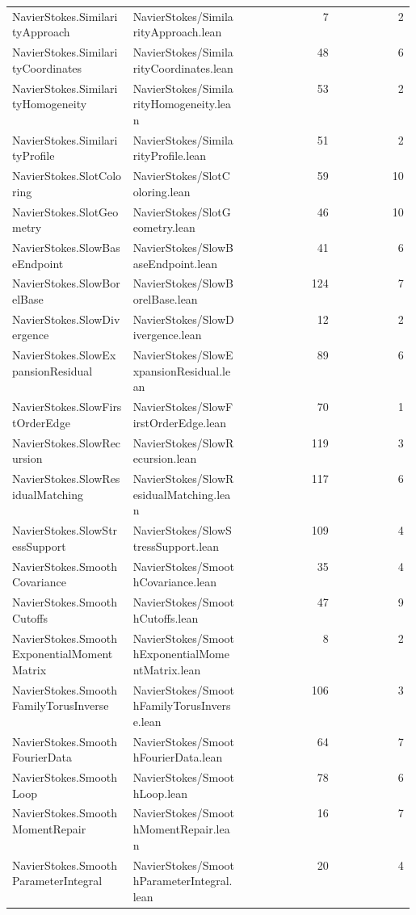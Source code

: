 \begin{longtable}{p{0.30\linewidth}p{0.28\linewidth}rr}
NavierStokes.SimilarityApproach & NavierStokes/SimilarityApproach.lean & 7 & 2\\
NavierStokes.SimilarityCoordinates & NavierStokes/SimilarityCoordinates.lean & 48 & 6\\
NavierStokes.SimilarityHomogeneity & NavierStokes/SimilarityHomogeneity.lean & 53 & 2\\
NavierStokes.SimilarityProfile & NavierStokes/SimilarityProfile.lean & 51 & 2\\
NavierStokes.SlotColoring & NavierStokes/SlotColoring.lean & 59 & 10\\
NavierStokes.SlotGeometry & NavierStokes/SlotGeometry.lean & 46 & 10\\
NavierStokes.SlowBaseEndpoint & NavierStokes/SlowBaseEndpoint.lean & 41 & 6\\
NavierStokes.SlowBorelBase & NavierStokes/SlowBorelBase.lean & 124 & 7\\
NavierStokes.SlowDivergence & NavierStokes/SlowDivergence.lean & 12 & 2\\
NavierStokes.SlowExpansionResidual & NavierStokes/SlowExpansionResidual.lean & 89 & 6\\
NavierStokes.SlowFirstOrderEdge & NavierStokes/SlowFirstOrderEdge.lean & 70 & 1\\
NavierStokes.SlowRecursion & NavierStokes/SlowRecursion.lean & 119 & 3\\
NavierStokes.SlowResidualMatching & NavierStokes/SlowResidualMatching.lean & 117 & 6\\
NavierStokes.SlowStressSupport & NavierStokes/SlowStressSupport.lean & 109 & 4\\
NavierStokes.SmoothCovariance & NavierStokes/SmoothCovariance.lean & 35 & 4\\
NavierStokes.SmoothCutoffs & NavierStokes/SmoothCutoffs.lean & 47 & 9\\
NavierStokes.SmoothExponentialMomentMatrix & NavierStokes/SmoothExponentialMomentMatrix.lean & 8 & 2\\
NavierStokes.SmoothFamilyTorusInverse & NavierStokes/SmoothFamilyTorusInverse.lean & 106 & 3\\
NavierStokes.SmoothFourierData & NavierStokes/SmoothFourierData.lean & 64 & 7\\
NavierStokes.SmoothLoop & NavierStokes/SmoothLoop.lean & 78 & 6\\
NavierStokes.SmoothMomentRepair & NavierStokes/SmoothMomentRepair.lean & 16 & 7\\
NavierStokes.SmoothParameterIntegral & NavierStokes/SmoothParameterIntegral.lean & 20 & 4\\

\end{longtable}
